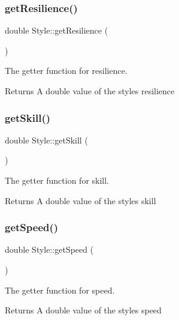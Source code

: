 \subsubsection{\texorpdfstring{getResilience()}{getResilience()}}
{\footnotesize\ttfamily double Style\+::get\+Resilience (\begin{DoxyParamCaption}{ }\end{DoxyParamCaption})}



The getter function for resilience. 

\begin{DoxyReturn}{Returns}
A double value of the style\textquotesingle{}s resilience 
\end{DoxyReturn}
\mbox{\label{class_style_a26b48e7f292efedbca64d0463fcf7685}} 
\subsubsection{\texorpdfstring{getSkill()}{getSkill()}}
{\footnotesize\ttfamily double Style\+::get\+Skill (\begin{DoxyParamCaption}{ }\end{DoxyParamCaption})}



The getter function for skill. 

\begin{DoxyReturn}{Returns}
A double value of the style\textquotesingle{}s skill 
\end{DoxyReturn}
\mbox{\label{class_style_a54914751bd96424727451083f7c4a29b}} 
\subsubsection{\texorpdfstring{getSpeed()}{getSpeed()}}
{\footnotesize\ttfamily double Style\+::get\+Speed (\begin{DoxyParamCaption}{ }\end{DoxyParamCaption})}



The getter function for speed. 

\begin{DoxyReturn}{Returns}
A double value of the style\textquotesingle{}s speed 
\end{DoxyReturn}
\mbox{\label{class_style_a6105e3a05ccd4face706a0c66ca863a8}} 
